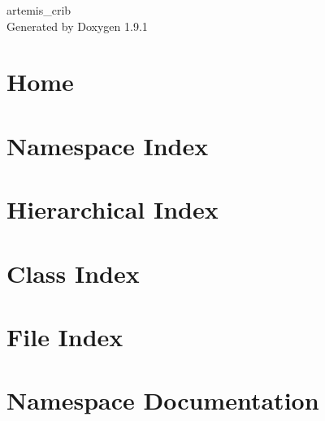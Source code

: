 \let\mypdfximage\pdfximage\def\pdfximage{\immediate\mypdfximage}\documentclass[twoside]{book}
\newcommand{\+}{\discretionary{\mbox{\scriptsize$\hookleftarrow$}}{}{}}
\newcommand{\clearemptydoublepage}{%
  \newpage{\pagestyle{empty}\cleardoublepage}%
}
\begin{document}
\raggedbottom

\hypersetup{pageanchor=false,
             bookmarksnumbered=true,
             pdfencoding=unicode
            }
\begin{titlepage}
\vspace*{7cm}
\begin{center}%
{\Large artemis\+\_\+crib }\\
\vspace*{1cm}
{\large Generated by Doxygen 1.9.1}\\
\end{center}
\end{titlepage}
\clearemptydoublepage
{}
\tableofcontents
\clearemptydoublepage
{}
\hypersetup{pageanchor=true}

\chapter{Home}
\label{index}\hypertarget{index}{}
\chapter{Namespace Index}

\chapter{Hierarchical Index}

\chapter{Class Index}

\chapter{File Index}

\chapter{Namespace Documentation}

\end{document}
